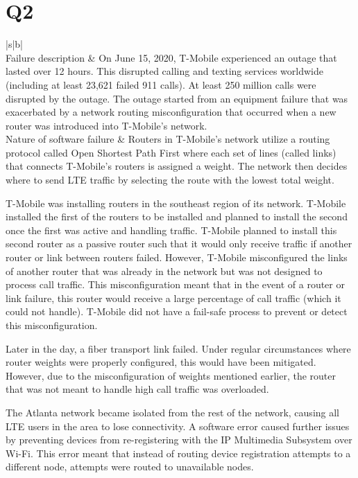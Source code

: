\documentclass[12pt, letterpaper, titlepage]{article}
\begin{document}
\section*{Q2}
\begin{tabularx}{\textwidth}{|s|b|}
    \hline
     \\
    \hline
    Failure description 
    & On June 15, 2020, T-Mobile experienced an outage that lasted over 12 hours. This disrupted calling and texting services worldwide (including at least 23,621 failed 911 calls). At least 250 million calls were disrupted by the outage. The outage started from an equipment failure that was exacerbated by a network routing misconfiguration that occurred when a new router was introduced into T-Mobile's network. \\
    \hline
    Nature of software failure 
    & 
    Routers in T-Mobile's network utilize a routing protocol called Open Shortest Path First where each set of lines (called links) that connects T-Mobile's routers is assigned a weight. The network then decides where to send LTE traffic by selecting the route with the lowest total weight. \newline
    
    T-Mobile was installing routers in the southeast region of its network. T-Mobile installed the first of the routers to be installed and planned to install the second once the first was active and handling traffic. T-Mobile planned to install this second router as a passive router such that it would only receive traffic if another router or link between routers failed. However, T-Mobile misconfigured the links of another router that was already in the network but was not designed to process call traffic. This misconfiguration meant that in the event of a router or link failure, this router would receive a large percentage of call traffic (which it could not handle). T-Mobile did not have a fail-safe process to prevent or detect this misconfiguration. \newline
    
    Later in the day, a fiber transport link failed. Under regular circumstances where router weights were properly configured, this would have been mitigated. However, due to the misconfiguration of weights mentioned earlier, the router that was not meant to handle high call traffic was overloaded. \newline

    The Atlanta network became isolated from the rest of the network, causing all LTE users in the area to lose connectivity. A software error caused further issues by preventing devices from re-registering with the IP Multimedia Subsystem over Wi-Fi. This error meant that instead of routing device registration attempts to a different node, attempts were routed to unavailable nodes. \newline


\end{tabularx}
\end{document}
